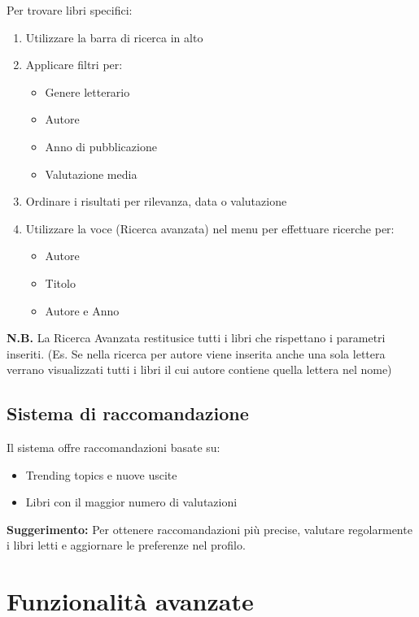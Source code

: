 \documentclass[12pt,a4paper]{article}
\begin{document}
Per trovare libri specifici:

\begin{enumerate}
    \item Utilizzare la barra di ricerca in alto
    \item Applicare filtri per:
    \begin{itemize}
        \item Genere letterario
        \item Autore
        \item Anno di pubblicazione
        \item Valutazione media
    \end{itemize}
    \item Ordinare i risultati per rilevanza, data o valutazione
    \item Utilizzare la voce (Ricerca avanzata) nel menu per effettuare ricerche per:
    \begin{itemize}
        \item Autore
        \item Titolo
        \item Autore e Anno
    \end{itemize}
\end{enumerate}
\textbf{N.B.}
La Ricerca Avanzata restitusice tutti i libri che rispettano i parametri inseriti. (Es. Se nella ricerca per autore viene inserita anche una sola lettera verrano visualizzati tutti i libri il cui autore contiene quella lettera nel nome)

\subsection{Sistema di raccomandazione}

Il sistema offre raccomandazioni basate su:

\begin{itemize}
    \item Trending topics e nuove uscite
    \item Libri con il maggior numero di valutazioni
\end{itemize}

\begin{infobox}
\textbf{Suggerimento:} Per ottenere raccomandazioni più precise, valutare regolarmente i libri letti e aggiornare le preferenze nel profilo.
\end{infobox}

\section{Funzionalità avanzate}
\end{document}
